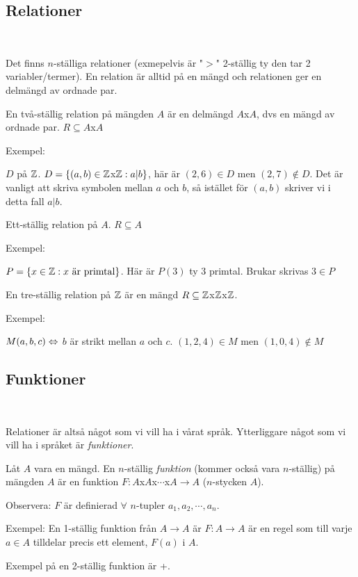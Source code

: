 \subsection{Relationer}\hfill\\
\par\bigskip
\noindent Det finns $n$-ställiga relationer (exmepelvis är "$>$" 2-ställig ty den tar 2 variabler/termer). En relation är alltid på en mängd och relationen ger en delmängd av ordnade par.
\par\bigskip
\noindent En två-ställig relation på mängden $A$ är en delmängd $A$x$A$, dvs en mängd av ordnade par. $R\subseteq A$x$A$
\par\bigskip
\noindent Exempel:\par
\noindent $D$ på $\mathbb{Z}$. $D = \{(a,b)\in\mathbb{Z}$x$\mathbb{Z}: a|b\}$, här är $(2,6)\in D$ men $(2,7)\notin D$. Det är vanligt att skriva symbolen mellan $a$ och $b$, så istället för $(a,b)$ skriver vi i detta fall $a|b$.
\par\bigskip
\noindent Ett-ställig relation på $A$. $R\subseteq A$
\par\bigskip
\noindent Exempel:\par
\noindent $P=\{x\in\mathbb{Z}:\text{$x$ är primtal}\}$. Här är $P(3)$ ty 3 primtal. Brukar skrivas $3\in P$
\par\bigskip
\noindent En tre-ställig relation på $\mathbb{Z}$ är en mängd $R\subseteq\mathbb{Z}$x$\mathbb{Z}$x$\mathbb{Z}$.
\par\bigskip
\noindent Exempel:\par
\noindent $M(a,b,c)\Leftrightarrow$ $b$ är strikt mellan $a$ och $c$. $(1,2,4)\in M$ men $(1,0,4)\notin M$
\par\bigskip
\subsection{Funktioner}\hfill\\
\par\bigskip
\noindent Relationer är altså något som vi vill ha i vårat språk. Ytterliggare något som vi vill ha i språket är \textit{funktioner}.
\par\bigskip
\noindent Låt $A$ vara en mängd. En $n$-ställig \textit{funktion} (kommer också vara $n$-ställig) på mängden $A$ är en funktion $F:A$x$A$x$\cdots$x$A\to A$ ($n$-stycken $A$).\par
\noindent Observera: $F$ är definierad $\forall$ $n$-tupler $a_1,a_2,\cdots, a_n$.
\par\bigskip
\noindent Exempel: En 1-ställig funktion från $A\to A$ är $F:A\to A$ är en regel som till varje $a\in A$ tilldelar precis ett element, $F(a)$ i $A$.
\par\bigskip
\noindent Exempel på en 2-ställig funktion är +.
\par\bigskip
